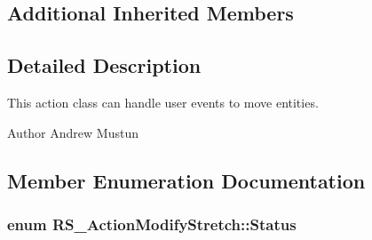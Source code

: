 \subsection*{Additional Inherited Members}


\subsection{Detailed Description}
This action class can handle user events to move entities.

\begin{DoxyAuthor}{Author}
Andrew Mustun 
\end{DoxyAuthor}


\subsection{Member Enumeration Documentation}
\hypertarget{classRS__ActionModifyStretch_a76e24e563deadcc168b1af226cff7666}{
\subsubsection[{Status}]{\setlength{\rightskip}{0pt plus 5cm}enum {\bf R\-S\-\_\-\-Action\-Modify\-Stretch\-::\-Status}}}\label{classRS__ActionModifyStretch_a76e24e563deadcc168b1af226cff7666}
